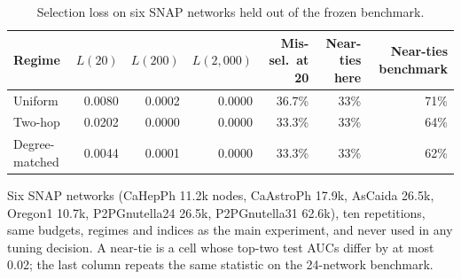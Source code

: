 \begin{table}[htbp]
\centering
\footnotesize
\caption{Selection loss on six SNAP networks held out of the frozen benchmark.}
\label{tab:external}
\begin{tabular}{l r r r r r r}
\toprule
Regime & $L(20)$ & $L(200)$ & $L(2{,}000)$ & Mis-sel.\ at 20 & Near-ties here & Near-ties benchmark \\
\midrule
Uniform & 0.0080 & 0.0002 & 0.0000 & 36.7\% & 33\% & 71\% \\
Two-hop & 0.0202 & 0.0000 & 0.0000 & 33.3\% & 33\% & 64\% \\
Degree-matched & 0.0044 & 0.0001 & 0.0000 & 33.3\% & 33\% & 62\% \\
\bottomrule
\end{tabular}
\par\vspace{2pt}\begin{minipage}{\linewidth}\footnotesize Six SNAP networks (CaHepPh 11.2k nodes, CaAstroPh 17.9k, AsCaida 26.5k, Oregon1 10.7k, P2PGnutella24 26.5k, P2PGnutella31 62.6k), ten repetitions, same budgets, regimes and indices as the main experiment, and never used in any tuning decision. A near-tie is a cell whose top-two test AUCs differ by at most 0.02; the last column repeats the same statistic on the 24-network benchmark.\end{minipage}
\end{table}
